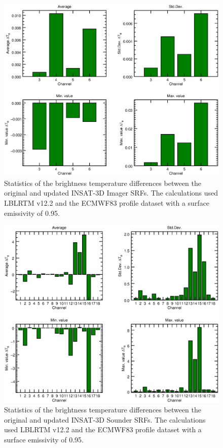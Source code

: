 \begin{figure}[H]
  \centering
  \includegraphics[scale=0.8]{graphics/imgr/imgr_insat3d.dTb_stats.eps}
  \caption{Statistics of the brightness temperature differences between the original and updated INSAT-3D Imager SRFs. The calculations used LBLRTM v12.2 and the ECMWF83 profile dataset with a surface emissivity of 0.95.}
  \label{fig:imgr_dTb_stats}
\end{figure}

\begin{figure}[H]
  \centering
  \includegraphics[scale=0.8]{graphics/sndr/sndr_insat3d.dTb_stats.eps}
  \caption{Statistics of the brightness temperature differences between the original and updated INSAT-3D Sounder SRFs. The calculations used LBLRTM v12.2 and the ECMWF83 profile dataset with a surface emissivity of 0.95.}
  \label{fig:sndr_dTb_stats}
\end{figure}

